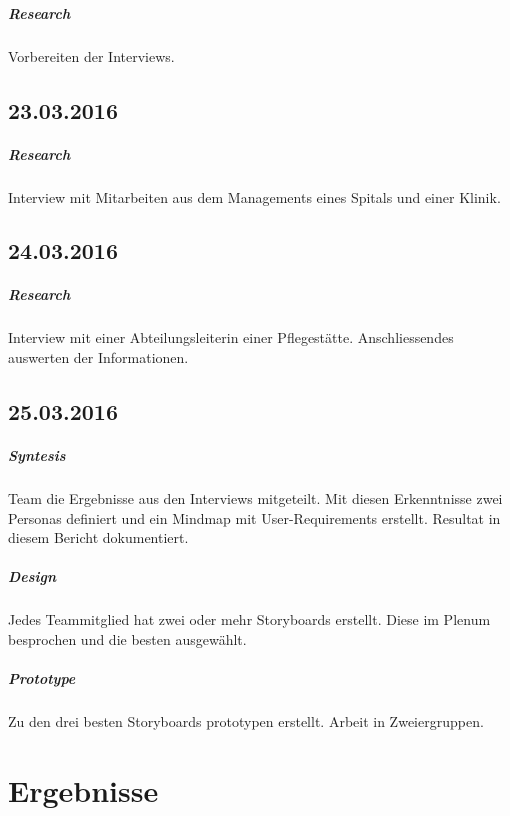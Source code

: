 \documentclass[a4paper]{scrreprt}
\begin{document}
\paragraph{Research}
Vorbereiten der Interviews.


\section*{23.03.2016}
\paragraph{Research}
Interview mit Mitarbeiten aus dem Managements eines Spitals und einer Klinik.


\section*{24.03.2016}
\paragraph{Research}
Interview mit einer Abteilungsleiterin einer Pflegestätte. Anschliessendes auswerten der Informationen.


\section*{25.03.2016}
\paragraph{Syntesis}
Team die Ergebnisse aus den Interviews mitgeteilt. Mit diesen Erkenntnisse zwei Personas definiert und ein Mindmap mit User-Requirements erstellt. Resultat in diesem Bericht dokumentiert.

\paragraph{Design}
Jedes Teammitglied hat zwei oder mehr Storyboards erstellt. Diese im Plenum besprochen und die besten ausgewählt. 

\paragraph{Prototype}
Zu den drei besten Storyboards prototypen erstellt. Arbeit in Zweiergruppen.



\chapter{Ergebnisse}
\end{document}
